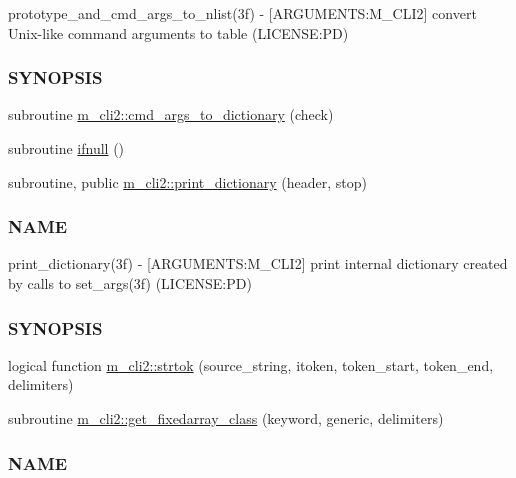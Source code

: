 \begin{DoxyCompactItemize}
\begin{DoxyCompactList}
prototype\+\_\+and\+\_\+cmd\+\_\+args\+\_\+to\+\_\+nlist(3f) -\/ \mbox{[}A\+R\+G\+U\+M\+E\+N\+TS\+:M\+\_\+\+C\+L\+I2\mbox{]} convert Unix-\/like command arguments to table (L\+I\+C\+E\+N\+SE\+:PD) \subsubsection*{S\+Y\+N\+O\+P\+S\+IS}\end{DoxyCompactList}\item 
subroutine \mbox{\hyperlink{namespacem__cli2_a3348b0c76dadd62c536e06f82bcb0331}{m\+\_\+cli2\+::cmd\+\_\+args\+\_\+to\+\_\+dictionary}} (check)
\item 
subroutine \mbox{\hyperlink{M__CLI2_8f90_aa26f90016621d1ee43d3b5b66316532b}{ifnull}} ()
\item 
subroutine, public \mbox{\hyperlink{namespacem__cli2_af7dc9c4b19e394533df4a8ef42fa111b}{m\+\_\+cli2\+::print\+\_\+dictionary}} (header, stop)
\begin{DoxyCompactList}\small\item\em \subsubsection*{N\+A\+ME}

print\+\_\+dictionary(3f) -\/ \mbox{[}A\+R\+G\+U\+M\+E\+N\+TS\+:M\+\_\+\+C\+L\+I2\mbox{]} print internal dictionary created by calls to set\+\_\+args(3f) (L\+I\+C\+E\+N\+SE\+:PD) \subsubsection*{S\+Y\+N\+O\+P\+S\+IS}\end{DoxyCompactList}\item 
logical function \mbox{\hyperlink{namespacem__cli2_a752fd074abce57e636e4572b3e55db3a}{m\+\_\+cli2\+::strtok}} (source\+\_\+string, itoken, token\+\_\+start, token\+\_\+end, delimiters)
\item 
subroutine \mbox{\hyperlink{namespacem__cli2_a6d8c1c441ac15f9a2882e50459d39565}{m\+\_\+cli2\+::get\+\_\+fixedarray\+\_\+class}} (keyword, generic, delimiters)
\begin{DoxyCompactList}\small\item\em \subsubsection*{N\+A\+ME}


\end{DoxyCompactList}
\end{DoxyCompactItemize}
